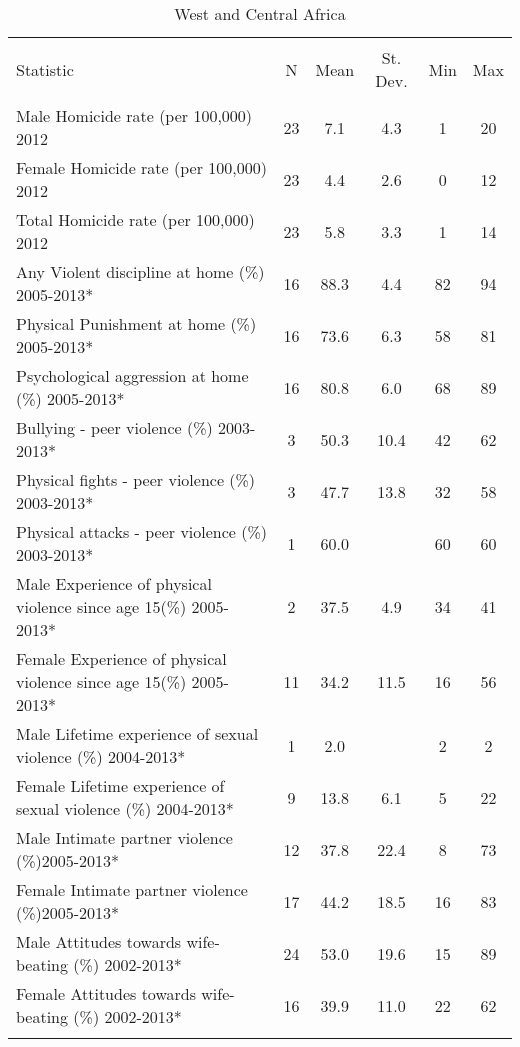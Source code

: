 
\begin{table}[!htbp] \centering 
  \caption{West and Central Africa} 
  \label{} 
\begin{tabular}{@{\extracolsep{5pt}}lccccc} 
\\[-1.8ex]\hline 
\hline \\[-1.8ex] 
Statistic & \multicolumn{1}{c}{N} & \multicolumn{1}{c}{Mean} & \multicolumn{1}{c}{St. Dev.} & \multicolumn{1}{c}{Min} & \multicolumn{1}{c}{Max} \\ 
\hline \\[-1.8ex] 
Male Homicide rate (per 100,000) 2012 & 23 & 7.1 & 4.3 & 1 & 20 \\ 
Female Homicide rate (per 100,000)  2012 & 23 & 4.4 & 2.6 & 0 & 12 \\ 
Total Homicide rate (per 100,000)  2012 & 23 & 5.8 & 3.3 & 1 & 14 \\ 
Any Violent discipline at home (\%) 2005-2013* & 16 & 88.3 & 4.4 & 82 & 94 \\ 
Physical Punishment at home (\%) 2005-2013* & 16 & 73.6 & 6.3 & 58 & 81 \\ 
Psychological aggression at home (\%) 2005-2013* & 16 & 80.8 & 6.0 & 68 & 89 \\ 
Bullying - peer violence (\%) 2003-2013* & 3 & 50.3 & 10.4 & 42 & 62 \\ 
Physical fights - peer violence (\%) 2003-2013* & 3 & 47.7 & 13.8 & 32 & 58 \\ 
Physical attacks - peer violence (\%) 2003-2013* & 1 & 60.0 &  & 60 & 60 \\ 
Male Experience of physical violence since age 15(\%) 2005-2013* & 2 & 37.5 & 4.9 & 34 & 41 \\ 
Female Experience of physical violence since age 15(\%) 2005-2013* & 11 & 34.2 & 11.5 & 16 & 56 \\ 
Male Lifetime experience of sexual violence (\%) 2004-2013* & 1 & 2.0 &  & 2 & 2 \\ 
Female Lifetime experience of sexual violence (\%) 2004-2013* & 9 & 13.8 & 6.1 & 5 & 22 \\ 
Male Intimate partner violence (\%)2005-2013* & 12 & 37.8 & 22.4 & 8 & 73 \\ 
Female Intimate partner violence (\%)2005-2013* & 17 & 44.2 & 18.5 & 16 & 83 \\ 
Male Attitudes towards wife-beating (\%) 2002-2013* & 24 & 53.0 & 19.6 & 15 & 89 \\ 
Female Attitudes towards wife-beating (\%) 2002-2013* & 16 & 39.9 & 11.0 & 22 & 62 \\ 
\hline \\[-1.8ex] 
\end{tabular} 
\end{table} 
